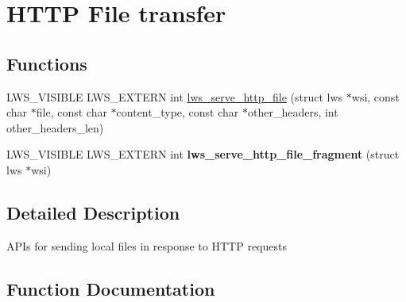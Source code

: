 \hypertarget{group__httpft}{}\section{H\+T\+TP File transfer}
\label{group__httpft}
\subsection*{Functions}
\begin{DoxyCompactItemize}
\item 
L\+W\+S\+\_\+\+V\+I\+S\+I\+B\+LE L\+W\+S\+\_\+\+E\+X\+T\+E\+RN int \hyperlink{group__httpft_gab393a06d3d2722af4c3f8b06842c80d7}{lws\+\_\+serve\+\_\+http\+\_\+file} (struct lws $\ast$wsi, const char $\ast$file, const char $\ast$content\+\_\+type, const char $\ast$other\+\_\+headers, int other\+\_\+headers\+\_\+len)
\item 
L\+W\+S\+\_\+\+V\+I\+S\+I\+B\+LE L\+W\+S\+\_\+\+E\+X\+T\+E\+RN int {\bfseries lws\+\_\+serve\+\_\+http\+\_\+file\+\_\+fragment} (struct lws $\ast$wsi)\hypertarget{group__httpft_ga29e1123f6d56cd777b3e5bf9ca40f9e5}{}\label{group__httpft_ga29e1123f6d56cd777b3e5bf9ca40f9e5}

\end{DoxyCompactItemize}


\subsection{Detailed Description}
A\+P\+Is for sending local files in response to H\+T\+TP requests 

\subsection{Function Documentation}
